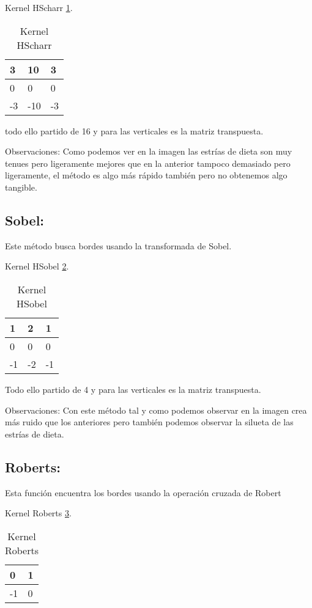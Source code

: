 Kernel HScharr \ref{F_k3}.
\begin{table}[]
	\centering
	\caption{Kernel HScharr}
	\label{F_k3}
	\begin{tabular}{|l|l|l|}
		\hline
		3  & 10  & 3 \\ \hline
		0  & 0   & 0 \\ \hline
		-3 & -10 & -3 \\ \hline
	\end{tabular}
\end{table}
todo ello partido de 16 y para las verticales es la matriz transpuesta. 




Observaciones:
Como podemos ver en la imagen las estrías de dieta son muy tenues pero ligeramente mejores que en la anterior tampoco demasiado pero ligeramente, el método es algo más rápido también pero no obtenemos algo tangible.




\subsection{Sobel:}
Este método busca bordes usando la transformada de Sobel.


Kernel HSobel \ref{F_k4}.
\begin{table}[]
	\centering
	\caption{Kernel HSobel}
	\label{F_k4}
	\begin{tabular}{|l|l|l|}
		\hline
		1  & 2  & 1 \\ \hline
		0  & 0  & 0 \\ \hline
		-1 & -2 & -1 \\ \hline
	\end{tabular}
\end{table}
Todo ello partido de 4 y para las verticales es la matriz transpuesta. 




Observaciones: 
Con este método tal y como podemos observar en la imagen crea más ruido que los anteriores pero también podemos observar la silueta de las estrías de dieta.


\subsection{Roberts:}

Esta función encuentra los bordes usando la operación cruzada de Robert

Kernel Roberts \ref{F_k5}.
\begin{table}[]
	\centering
	\caption{Kernel Roberts}
	\label{F_k5}
	\begin{tabular}{|l|l|}
		\hline
		0  & 1 \\ \hline
		-1 & 0 \\ \hline
	\end{tabular}
\end{table}




